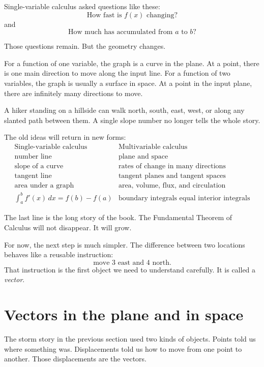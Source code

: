 Single-variable calculus asked questions like these:
\[
    \text{How fast is } f(x) \text{ changing?}
\]
and
\[
    \text{How much has accumulated from } a \text{ to } b?
\]

Those questions remain.  But the geometry changes.

For a function of one variable, the graph is a curve in the plane.  At a point, there
is one main direction to move along the input line.  For a function of two variables,
the graph is usually a surface in space.  At a point in the input plane, there are
infinitely many directions to move.

A hiker standing on a hillside can walk north, south, east, west, or along any slanted
path between them.  A single slope number no longer tells the whole story.

The old ideas will return in new forms:
\[
\begin{array}{c|c}
\text{Single-variable calculus} & \text{Multivariable calculus} \\ \hline
\text{number line} & \text{plane and space} \\
\text{slope of a curve} & \text{rates of change in many directions} \\
\text{tangent line} & \text{tangent planes and tangent spaces} \\
\text{area under a graph} & \text{area, volume, flux, and circulation} \\
\int_a^b f'(x)\,dx=f(b)-f(a) &
\text{boundary integrals equal interior integrals}
\end{array}
\]

The last line is the long story of the book.  The Fundamental Theorem of Calculus
will not disappear.  It will grow.

For now, the next step is much simpler.  The difference between two locations behaves
like a reusable instruction:
\[
    \text{move } 3 \text{ east and } 4 \text{ north}.
\]
That instruction is the first object we need to understand carefully.  It is called a
\emph{vector}.

\section{Vectors in the plane and in space}

The storm story in the previous section used two kinds of objects.  Points told us
where something was.  Displacements told us how to move from one point to another.
Those displacements are the vectors.

